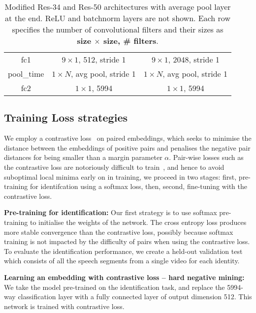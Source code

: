 \documentclass[a4paper]{article}
\def\newpara{\vspace{2pt}}
\def\aftertab{\vspace{-22pt}}
\def\subsec{\vspace{-5pt}}
\begin{document}
\begin{table}[ht]
\begin{tabular}{ c|c|c }
fc1 &  $ 9 \times 1$, 512, stride 1  &  $ 9 \times 1$, 2048, stride 1                  \\ 
pool\_time &  $ 1 \times N$, avg pool, stride 1  &  $ 1 \times N$, avg pool, stride 1\\ 
fc2 &  $ 1 \times 1$, 5994 &  $ 1 \times 1$, 5994 \\ 
\end{tabular}
\vspace{2pt}
\normalsize
\caption{Modified Res-34 and Res-50 architectures with average pool layer at the end. ReLU and batchnorm layers are not shown.  Each row specifies the number of convolutional filters and their sizes as {\bf size $\times$ size, \# filters}.}
\label{table:convnet}
\aftertab
\vspace{-8pt}
\end{table}

\subsection{Training Loss strategies}
\subsec
\label{sec:trainingloss}
We employ a contrastive loss~\cite{Chopra05,hadsell2006dimensionality}
on paired embeddings, which seeks to minimise the distance between the
embeddings of positive pairs and penalises the negative pair distances
for being smaller than a margin parameter $\alpha$. Pair-wise losses
such as the contrastive loss are notoriously difficult to
train~\cite{hermans2017defense}, and hence to avoid suboptimal local
minima early on in training, we proceed in two stages:
first, pre-training for identifcation using a softmax loss, then,
second, fine-tuning with the contrastive loss.

\newpara\noindent\textbf{Pre-training for identification:} Our first strategy is to use  softmax pre-training to initialise the weights of the network. The cross entropy
loss produces more stable convergence than the contrastive loss, possibly because softmax training is not impacted by the 
difficulty of pairs when using the contrastive loss. To evaluate the identification performance, we create a held-out validation test which consists of all the speech segments from a single video for each identity. 

\newpara\noindent\textbf{Learning an embedding with contrastive loss -- hard negative mining:} 
We take the model pre-trained on the identification task, and replace the 5994-way classification layer with a fully connected layer of output dimension 512. This network is trained with contrastive loss.
\end{document}
